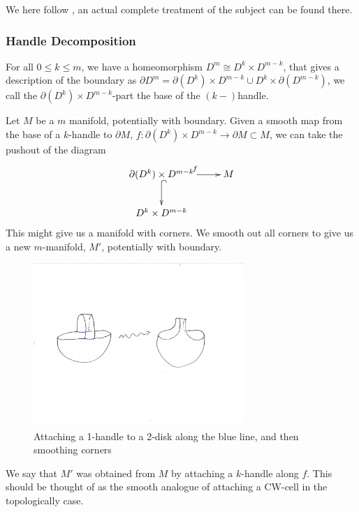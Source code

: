 \documentclass{article}
\newtheorem{proposed work}[theorem]{Proposed Work}
\newcommand{\xymat}[1]{\begin{align*}\xymatrix{ #1}\end{align*}}
\begin{document}
We here follow \cite{milnor2016morse}, an actual complete treatment of the subject can be found there.
\subsubsection{Handle Decomposition}
For all $0\leq k \leq m$, we have a homeomorphism $D^m\cong D^k\times D^{m-k}$, that gives a description of the boundary as $\partial D^m = \partial(D^k) \times D^{m-k} \cup D^k\times \partial(D^{m-k})$, we call the $\partial(D^k) \times D^{m-k}$-part the base of the $(k-)$handle. 

Let $M$ be a $m$ manifold, potentially with boundary. Given a smooth map from the base of a $k$-handle to $\partial M$, $f:\partial(D^k) \times D^{m-k}\to \partial M\subset M$, we can take the pushout of the diagram
\xymat{\partial(D^k) \times D^{m-k} \ar[r]^f \ar@{^{(}->}[d] & M \\ D^k\times D^{m-k} &}
This might give us a manifold with corners. We smooth out all corners to give us a new $m$-manifold, $M'$, potentially with boundary. 
\begin{figure}[h]
\includegraphics[width=8cm]{attach1handle.pdf}
\caption{Attaching a 1-handle to a 2-disk along the blue line, and then smoothing corners\label{attach1handle}}
\end{figure}
We say that $M'$ was obtained from $M$ by attaching a $k$-handle along $f$. This should be thought of as the smooth analogue of attaching a CW-cell in the topologically case.
\end{document}

